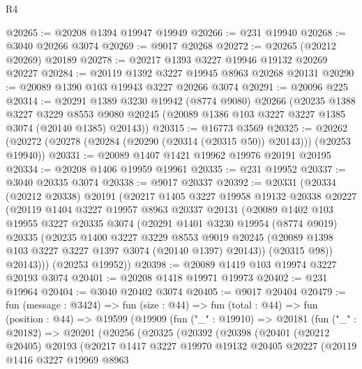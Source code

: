 \begin{lexlean}{R4}
\begin{coremodule}
@20265 := @20208 @1394 @19947 @19949
@20266 := @231 @19940
@20268 := @3040 @20266 @3074
@20269 := @9017 @20268
@20272 := @20265 (@20212 @20269) @20189
@20278 := @20217 @1393 @3227 @19946 @19132 @20269 @20227
@20284 := @20119 @1392 @3227 @19945 @8963 @20268 @20131
@20290 := @20089 @1390 @103 @19943 @3227 @20266 @3074
@20291 := @20096 @225
@20314 := @20291
    @1389
    @3230
    @19942
    (@8774 @9080)
    @20266
    (@20235
      @1388
      @3227
      @3229
      @8553
      @9080
      @20245
      (@20089 @1386 @103 @3227 @3227 @1385 @3074 (@20140 @1385) @20143))
@20315 := @16773 @3569
@20325 := @20262 (@20272 (@20278 (@20284 (@20290 (@20314 (@20315 @50)) @20143))) (@20253 @19940))
@20331 := @20089 @1407 @1421 @19962 @19976 @20191 @20195
@20334 := @20208 @1406 @19959 @19961
@20335 := @231 @19952
@20337 := @3040 @20335 @3074
@20338 := @9017 @20337
@20392 := @20331
    (@20334
      (@20212 @20338)
      @20191
      (@20217
        @1405
        @3227
        @19958
        @19132
        @20338
        @20227
        (@20119
          @1404
          @3227
          @19957
          @8963
          @20337
          @20131
          (@20089
            @1402
            @103
            @19955
            @3227
            @20335
            @3074
            (@20291
              @1401
              @3230
              @19954
              (@8774 @9019)
              @20335
              (@20235
                @1400
                @3227
                @3229
                @8553
                @9019
                @20245
                (@20089 @1398 @103 @3227 @3227 @1397 @3074 (@20140 @1397) @20143))
              (@20315 @98))
            @20143)))
      (@20253 @19952))
@20398 := @20089 @1419 @103 @19974 @3227 @20193 @3074
@20401 := @20208 @1418 @19971 @19973
@20402 := @231 @19964
@20404 := @3040 @20402 @3074
@20405 := @9017 @20404
@20479 := fun (message : @3424) =>
  fun (size : @44) =>
  fun (total : @44) =>
  fun (position : @44) =>
  @19599
    (@19909
      (fun ("_" : @19910) =>
      @20181
        (fun ("_" : @20182) =>
        @20201
          (@20256
            (@20325
              (@20392
                (@20398
                  (@20401
                    (@20212 @20405)
                    @20193
                    (@20217
                      @1417
                      @3227
                      @19970
                      @19132
                      @20405
                      @20227
                      (@20119
                        @1416
                        @3227
                        @19969
                        @8963

\end{coremodule}
\end{lexlean}
